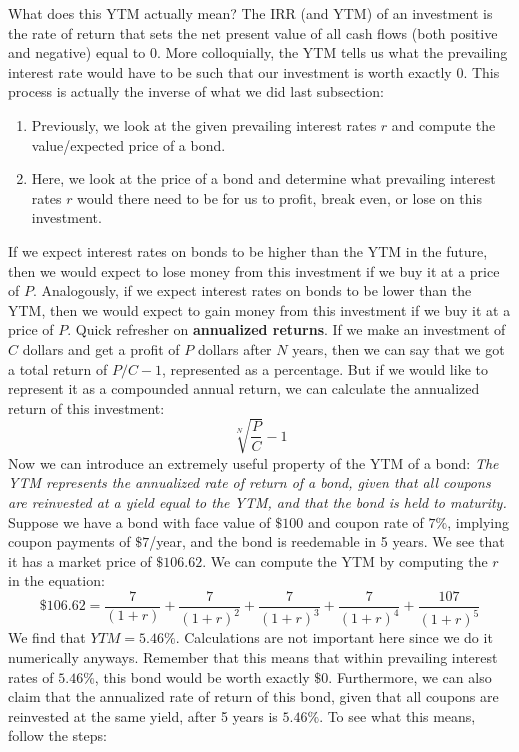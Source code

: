 \documentclass{article}
\begin{document}
    What does this YTM actually mean? The IRR (and YTM) of an investment is the rate of return that sets the net present value of all cash flows (both positive and negative) equal to $0$. More colloquially, the YTM tells us what the prevailing interest rate would have to be such that our investment is worth exactly $0$. This process is actually the inverse of what we did last subsection:
    \begin{enumerate}
      \item Previously, we look at the given prevailing interest rates $r$ and compute the value/expected price of a bond.
      \item Here, we look at the price of a bond and determine what prevailing interest rates $r$ would there need to be for us to profit, break even, or lose on this investment.
    \end{enumerate}
    If we expect interest rates on bonds to be higher than the YTM in the future, then we would expect to lose money from this investment if we buy it at a price of $P$. Analogously, if we expect interest rates on bonds to be lower than the YTM, then we would expect to gain money from this investment if we buy it at a price of $P$.
    Quick refresher on \textbf{annualized returns}. If we make an investment of $C$ dollars and get a profit of $P$ dollars after $N$ years, then we can say that we got a total return of $P/C - 1$, represented as a percentage. But if we would like to represent it as a compounded annual return, we can calculate the annualized return of this investment:
    \begin{equation}
      \sqrt[N]{\frac{P}{C}} - 1
    \end{equation}
    Now we can introduce an extremely useful property of the YTM of a bond: \textit{The YTM represents the annualized rate of return of a bond, given that all coupons are reinvested at a yield equal to the YTM, and that the bond is held to maturity. }
    Suppose we have a bond with face value of $\$100$ and coupon rate of $7\%$, implying coupon payments of $\$7$/year, and the bond is reedemable in 5 years. We see that it has a market price of $\$106.62$. We can compute the YTM by computing the $r$ in the equation:
    \begin{equation}
      \$106.62 = \frac{7}{(1+r)} + \frac{7}{(1+r)^2} + \frac{7}{(1+r)^3} + \frac{7}{(1+r)^4} + \frac{107}{(1+r)^5}
    \end{equation}
    We find that $YTM = 5.46\%$. Calculations are not important here since we do it numerically anyways. Remember that this means that within prevailing interest rates of $5.46\%$, this bond would be worth exactly $\$0$. Furthermore, we can also claim that the annualized rate of return of this bond, given that all coupons are reinvested at the same yield, after 5 years is $5.46\%$. To see what this means, follow the steps:
\end{document}
